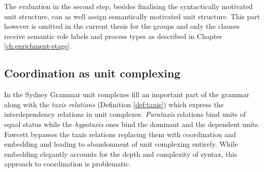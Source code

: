     The evaluation in the second step, besides finalising the syntactically motivated unit structure, can as well assign semantically motivated unit structure. This part however is omitted in the current thesis for the groups and only the clauses receive semantic role labels and process types as described in Chapter \ref{ch:enrichment-stage}.
    
    
    
    
    
    \subsection{Coordination as unit complexing} %
    \label{sec:coordination}
    
    In the Sydney Grammar unit complexes fill an important part of the grammar along with the \textit{taxis relations} (Definition \ref{def:taxis}) which express the interdependency relations in unit complexes. \textit{Parataxis} relations bind units of equal status while the \textit{hypotaxis} ones bind the dominant and the dependent units. Fawcett bypasses the taxis relations replacing them with coordination and embedding \citep[271]{Fawcett2000} and leading to abandonment of unit complexing entirely. While embedding elegantly accounts for the depth and complexity of syntax, this approach to coordination is problematic.
    
